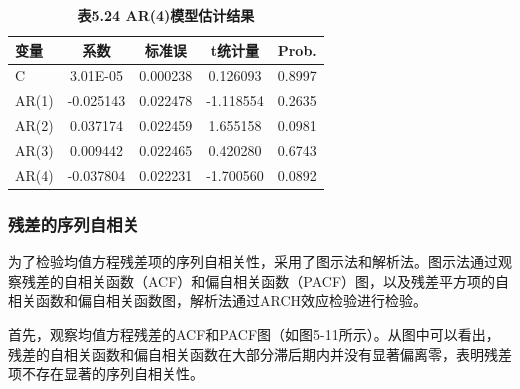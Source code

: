 \documentclass[12pt, a4paper]{article}
\numberwithin{equation}{section}
\begin{document}
\begin{table}[h!]
    \centering
    \captionsetup{labelformat=empty}
    \caption{\textbf{\fontsize{9pt}{11pt}\selectfont 表5.24 AR(4)模型估计结果}}
    \begin{tabular}{lcccc}
        \toprule
        变量    & 系数        & 标准误      & t统计量      & Prob.  \\
        \midrule
        C     & 3.01E-05  & 0.000238 & 0.126093  & 0.8997 \\
        AR(1) & -0.025143 & 0.022478 & -1.118554 & 0.2635 \\
        AR(2) & 0.037174  & 0.022459 & 1.655158  & 0.0981 \\
        AR(3) & 0.009442  & 0.022465 & 0.420280  & 0.6743 \\
        AR(4) & -0.037804 & 0.022231 & -1.700560 & 0.0892 \\
        \bottomrule
    \end{tabular}
\end{table}

\subsubsection{残差的序列自相关}

为了检验均值方程残差项的序列自相关性，采用了图示法和解析法。图示法通过观察残差的自相关函数（ACF）和偏自相关函数（PACF）图，以及残差平方项的自相关函数和偏自相关函数图，解析法通过ARCH效应检验进行检验。

首先，观察均值方程残差的ACF和PACF图（如图5-11所示）。从图中可以看出，残差的自相关函数和偏自相关函数在大部分滞后期内并没有显著偏离零，表明残差项不存在显著的序列自相关性。
\end{document}
